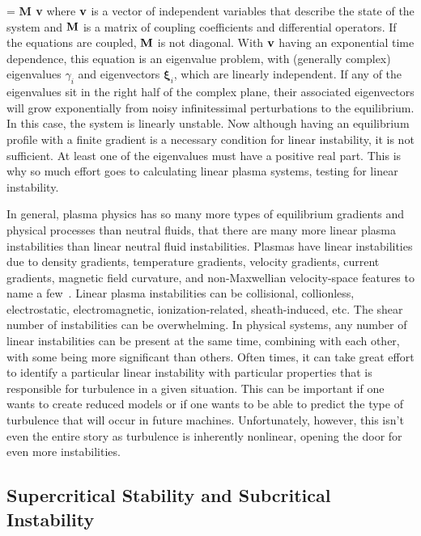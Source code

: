 \beq
\label{dyn_sys_lin}
 = {\bf M v}
\eeq
where ${\bf v}$ is a vector of independent variables that describe the state of the system and ${\bf M}$ is a matrix of coupling coefficients and differential operators. If the equations are
coupled, ${\bf M}$ is not diagonal. With ${\bf v}$ having an exponential time dependence, this equation is an eigenvalue problem, with (generally complex) eigenvalues $\gamma_i$
and eigenvectors $\bm{\xi}_i$, which are linearly independent. If any of the eigenvalues sit in the right half of the complex plane, their associated eigenvectors will grow exponentially
from noisy infinitessimal perturbations to the equilibrium. In this case, the system is linearly unstable. Now although having an equilibrium profile with a finite gradient is a necessary
condition for linear instability, it is not sufficient. At least one of the eigenvalues must have a positive real part. This is why so much effort goes to calculating linear plasma systems,
testing for linear instability.

In general, plasma physics has so many more types of equilibrium gradients and physical processes than neutral fluids, that there are many more linear plasma instabilities than
linear neutral fluid instabilities. Plasmas have linear instabilities due to density gradients, temperature gradients, velocity gradients, current gradients, magnetic field curvature,
and non-Maxwellian velocity-space features to name a few~\cite{wesson2004,chen2006}. 
Linear plasma instabilities can be collisional, collionless, electrostatic, electromagnetic, ionization-related, sheath-induced, etc. The shear number of instabilities can be overwhelming.
In physical systems, any number of linear instabilities can be present at the same time, combining with each other, with some being more significant than others. Often times, it can take
great effort to identify a particular linear instability with particular properties that is responsible for turbulence in a given situation. This can be important if one wants to create reduced
models or if one wants to be able to predict the type of turbulence that will occur in future machines. Unfortunately, however, this isn't even the entire story as turbulence is inherently nonlinear,
opening the door for even more instabilities.

\subsection{Supercritical Stability and Subcritical Instability}
\label{subcritcal_supercritical}

